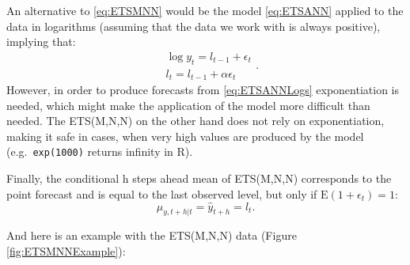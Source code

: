 \documentclass[
]{book}
\newenvironment{Shaded}{\begin{snugshade}}{\end{snugshade}}
\newcommand{\AttributeTok}[1]{\textcolor[rgb]{0.77,0.63,0.00}{#1}}
\newcommand{\ConstantTok}[1]{\textcolor[rgb]{0.00,0.00,0.00}{#1}}
\newcommand{\DecValTok}[1]{\textcolor[rgb]{0.00,0.00,0.81}{#1}}
\newcommand{\FloatTok}[1]{\textcolor[rgb]{0.00,0.00,0.81}{#1}}
\newcommand{\FunctionTok}[1]{\textcolor[rgb]{0.00,0.00,0.00}{#1}}
\newcommand{\NormalTok}[1]{#1}
\newcommand{\OtherTok}[1]{\textcolor[rgb]{0.56,0.35,0.01}{#1}}
\newcommand{\SpecialCharTok}[1]{\textcolor[rgb]{0.00,0.00,0.00}{#1}}
\newcommand{\StringTok}[1]{\textcolor[rgb]{0.31,0.60,0.02}{#1}}
\theoremstyle{definition}
\theoremstyle{definition}
\theoremstyle{definition}
\theoremstyle{definition}
\theoremstyle{remark}
\begin{document}
An alternative to \eqref{eq:ETSMNN} would be the model \eqref{eq:ETSANN} applied to the data in logarithms (assuming that the data we work with is always positive), implying that:
\begin{equation}
  \begin{aligned}
    & \log y_{t} = l_{t-1} + \epsilon_t \\
    & l_t = l_{t-1} + \alpha \epsilon_t
  \end{aligned} .
  \label{eq:ETSANNLogs}
\end{equation}
However, in order to produce forecasts from \eqref{eq:ETSANNLogs} exponentiation is needed, which might make the application of the model more difficult than needed. The ETS(M,N,N) on the other hand does not rely on exponentiation, making it safe in cases, when very high values are produced by the model (e.g.~\texttt{exp(1000)} returns infinity in R).

Finally, the conditional h steps ahead mean of ETS(M,N,N) corresponds to the point forecast and is equal to the last observed level, but only if \(\text{E}(1+\epsilon_t)=1\):
\begin{equation}
    \mu_{y,t+h|t} = \hat{y}_{t+h} = l_{t} .
  \label{eq:ETSMNNForecast}
\end{equation}

And here is an example with the ETS(M,N,N) data (Figure \ref{fig:ETSMNNExample}):

\begin{Shaded}
\end{Shaded}
\end{document}
